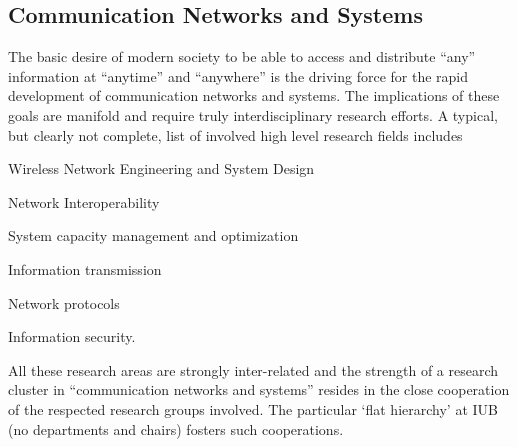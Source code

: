 \subsection{Communication Networks and Systems}

The basic desire of modern society to be able to access and
distribute ``any'' information at ``anytime'' and ``anywhere'' is
the driving force for the rapid development of communication
networks and systems. The implications of these goals are manifold
and require truly interdisciplinary research efforts. A typical, but
clearly not complete, list of involved high level research fields
includes

\begin{myitemize}
\item Wireless Network Engineering and System Design
\item Network Interoperability
\item System capacity management and optimization
\item Information transmission
\item Network protocols 
\item Information security.
\end{myitemize}

All these research areas are strongly inter-related and the strength
of a research cluster in ``communication networks and systems''
resides in the close cooperation of the respected research groups
involved. The particular `flat hierarchy' at IUB (no departments and
chairs) fosters such cooperations.

